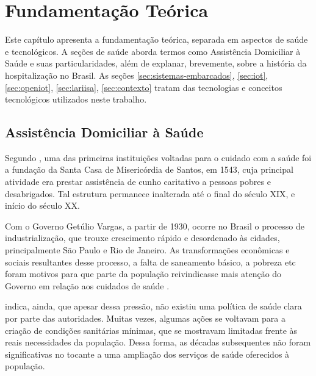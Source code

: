 \chapter{Fundamentação Teórica}\label{cap:fundamentacao-teorica}

Este capítulo apresenta a fundamentação teórica, separada em aspectos de saúde e
tecnológicos. A seções de saúde aborda termos como Assistência Domiciliar à
Saúde e suas particularidades, além de explanar, brevemente, sobre a história da
hospitalização no Brasil. As seções \ref{sec:sistemas-embarcados}, 
\ref{sec:iot}, \ref{sec:openiot}, \ref{sec:lariisa}, \ref{sec:contexto} tratam das
tecnologias e conceitos tecnológicos utilizados neste trabalho.

\section{Assistência Domiciliar à Saúde} \label{sec:ads}

Segundo , uma das primeiras instituições voltadas para o
cuidado com a saúde foi a fundação da Santa Casa de Misericórdia de Santos, em
1543, cuja principal atividade era prestar assistência de cunho caritativo a
pessoas pobres e desabrigados. Tal estrutura permanece inalterada até o final do
século XIX, e início do século XX.

Com o Governo Getúlio Vargas, a partir de 1930, ocorre no Brasil o processo de
industrialização, que trouxe crescimento rápido e desordenado às cidades,
principalmente São Paulo e Rio de Janeiro. As transformações econômicas e
sociais resultantes desse processo, a falta de saneamento básico, a pobreza etc
foram motivos para que parte da população reivindicasse mais atenção do Governo
em relação aos cuidados de saúde \cite{carvalho1984}.

 indica, ainda, que apesar dessa pressão, não existiu
uma política de saúde clara por parte das autoridades. Muitas vezes, algumas
ações se voltavam para a criação de condições sanitárias mínimas, que se
mostravam limitadas frente às reais necessidades da população. Dessa forma, as
décadas subsequentes não foram significativas no tocante a uma ampliação dos
serviços de saúde oferecidos à população.


